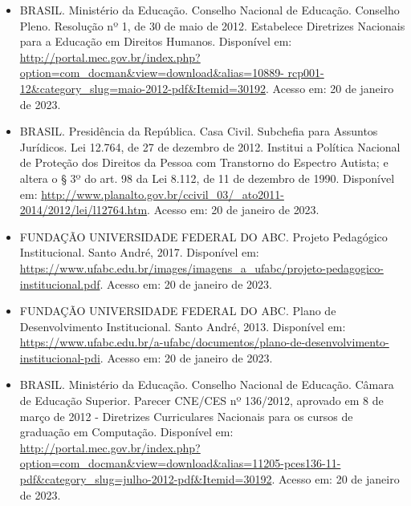 \begin{itemize}
    \item BRASIL. Ministério da Educação. Conselho Nacional de Educação.
    Conselho Pleno. Resolução nº 1, de 30 de maio de 2012. Estabelece
    Diretrizes Nacionais para a Educação em Direitos Humanos. 
    Disponível em: \url{http://portal.mec.gov.br/index.php?option=com_docman&view=download&alias=10889-
    rcp001-12&category_slug=maio-2012-pdf&Itemid=30192}. 
    Acesso em: 20 de janeiro de 2023.
    
    \item BRASIL. Presidência da República. Casa Civil. Subchefia para Assuntos
    Jurídicos. Lei 12.764, de 27 de dezembro de 2012. Institui a Política
    Nacional de Proteção dos Direitos da Pessoa com Transtorno do Espectro
    Autista; e altera o § 3º do art. 98 da Lei 8.112, de 11 de dezembro de
    1990. 
    Disponível em: \url{http://www.planalto.gov.br/ccivil_03/_ato2011-2014/2012/lei/l12764.htm}.
    Acesso em: 20 de janeiro de 2023.
    
    \item FUNDAÇÃO UNIVERSIDADE FEDERAL DO ABC. Projeto Pedagógico Institucional. Santo
    André, 2017. Disponível em:\\
    \href{https://www.ufabc.edu.br/images/imagens_a_ufabc/projeto-pedagogico-institucional.pdf}{https://www.ufabc.edu.br/images/imagens\_a\_ufabc/projeto-pedagogico-institucional.pdf}.
    Acesso em: 20 de janeiro de 2023.
    
    \item FUNDAÇÃO UNIVERSIDADE FEDERAL DO ABC. Plano de Desenvolvimento
    Institucional. Santo André, 2013. Disponível em:
    \href{https://www.ufabc.edu.br/a-ufabc/documentos/plano-de-desenvolvimento-institucional-pdi}{https://www.ufabc.edu.br/a-ufabc/documentos/plano-de-desenvolvimento-institucional-pdi}.
    Acesso em: 20 de janeiro de 2023.
    
    \item BRASIL. Ministério da Educação. Conselho Nacional de Educação. Câmara
    de Educação Superior. Parecer CNE/CES nº 136/2012, aprovado em 8 de março
    de 2012 - Diretrizes Curriculares Nacionais para os cursos de graduação em
    Computação. 
    Disponível em:\\
    \href{http://portal.mec.gov.br/index.php?option=com_docman&view=download&alias=11205-pces136-11-pdf&category_slug=julho-2012-pdf&Itemid=30192}{http://portal.mec.gov.br/index.php?option=com\_docman\&view=download\&alias=11205-pces136-11-pdf\&category\_slug=julho-2012-pdf\&Itemid=30192}.
    Acesso em: 20 de janeiro de 2023.
    

\end{itemize}
